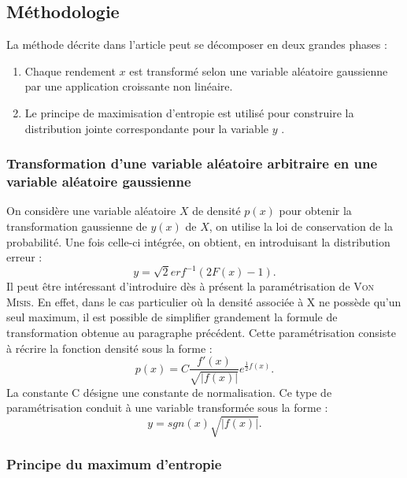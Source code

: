 \documentclass{article}
\begin{document}
\subsection{Méthodologie}

 La méthode décrite dans l'article peut se décomposer en deux grandes phases :
 \begin{enumerate}
 \item Chaque rendement $ x $ est transformé selon une variable aléatoire gaussienne par une application croissante non linéaire.
 \item  Le principe de  maximisation d'entropie est utilisé pour construire la distribution jointe correspondante pour la variable $ y $ . 
 \end{enumerate}
 
 \subsubsection{Transformation d'une variable aléatoire arbitraire en une variable aléatoire gaussienne}
 
On considère une variable aléatoire $ X $ de densité $ p(x) $ pour obtenir  la transformation gaussienne de $ y(x) $ de $ X $, on utilise la loi de conservation de la probabilité. Une fois celle-ci intégrée, on obtient, en introduisant la distribution erreur :
\begin{equation}
y=\sqrt{2}erf^{-1}(2F(x)-1).
\end{equation}
 Il peut être intéressant d'introduire dès à présent la paramétrisation de \textsc{Von Misis}. En effet, dans le cas particulier où la densité associée à X ne possède qu'un seul maximum, il est possible de simplifier grandement la formule de transformation obtenue au paragraphe précédent. Cette paramétrisation consiste à récrire la fonction densité sous la forme : 
 \begin{equation}
 p(x)=C\frac{f'(x)}{\sqrt{\vert f(x)\vert }}e^{\frac{1}{2}f(x)}.
 \end{equation}
 La constante C désigne une constante de normalisation. Ce type de paramétrisation conduit à une variable transformée sous la forme :
 \begin{equation}
 y=sgn(x)\sqrt{\vert f(x)\vert}.
 \end{equation}
 
  \subsubsection{Principe du maximum d'entropie}
  
\end{document}
